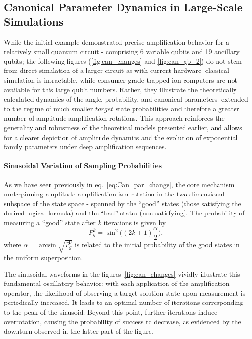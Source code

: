 \documentclass[encoding=utf8,british]{tumphthesis}
\begin{document}
    \subsection{Canonical Parameter Dynamics in Large-Scale Simulations}
    While the initial example demonstrated precise amplification behavior for a relatively small quantum circuit - comprising 6 variable qubits and 19 
    ancillary qubits; the following figures (\ref{fig:can_changes} and \ref{fig:can_gb_2}) do not stem from direct simulation of a larger circuit as with current hardware, classical simulation is intractable, 
    while consumer grade trapped-ion computers are not available for this large qubit numbers. Rather, they illustrate the theoretically calculated dynamics of the 
    angle, probability, and canonical parameters, extended to the regime of much smaller $target$ state probabilities and therefore a greater number of amplitude amplification rotations. This 
    approach reinforces the generality and robustness of the theoretical models presented earlier, and allows for a clearer depiction of amplitude dynamics and 
    the evolution of exponential family parameters under deep amplification sequences.

    \paragraph{Sinusoidal Variation of Sampling Probabilities}
    As we have seen previously in eq.~\ref{eq:Can_par_change}, the core mechanism underpinning amplitude amplification is a rotation in 
    the two-dimensional subspace of the state space - spanned by the “good” states (those satisfying the desired logical formula) and the “bad” states (non-satisfying). 
    The probability of measuring a “good” state after $k$ iterations is given by
    \begin{equation*}
        P_g^k = \sin^2\bigl((2k + 1) \frac{\alpha}{2}\bigr),
    \end{equation*}
    where $\alpha = \arcsin\sqrt{P_g^0}$ is related to the initial probability of the good states in the uniform superposition.

    The sinusoidal waveforms in the figures~\ref{fig:can_changes} vividly illustrate this fundamental oscillatory behavior: with each application of the amplification operator, 
    the likelihood of observing a target solution state upon measurement is periodically increased.
    It leads to an optimal number of iterations corresponding to the peak of the sinusoid. Beyond this point, further iterations induce overrotation, causing the probability 
    of success to decrease, as evidenced by the downturn observed in the latter part of the figure.
\end{document}
